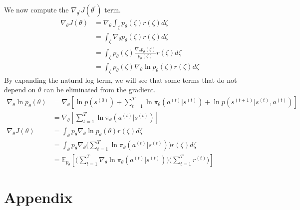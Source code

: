 \documentclass[11pt]{article}
\begin{document}
We now compute the $\nabla_{\theta^{'}}J(\theta^{'})$ term.
\begin{align*}
    \nabla_\theta J(\theta) &= \nabla_\theta \int_\zeta p_\theta(\zeta)r(\zeta)d\zeta \\ 
    &= \int_\zeta \nabla_\theta p_\theta(\zeta)r(\zeta)d\zeta \\
    &= \int_\zeta p_\theta(\zeta) \frac{\nabla_\theta p_\theta(\zeta)}{p_\theta(\zeta)}r(\zeta)d\zeta\\
    &= \int_\zeta p_\theta(\zeta) \nabla_\theta \ln p_\theta(\zeta)r(\zeta)d\zeta
\end{align*}
By expanding the natural log term, we will see that some terms that do not depend on $\theta$ can be eliminated from the gradient.
\begin{align*}
    \nabla_\theta \ln p_\theta(\theta) & = \nabla_\theta \left[ \ln p(s^{(0)}) + \sum_{t=1}^T \ln \pi_\theta(a^{(t)}|s^{(t)}) + \ln p(s^{(t+1)}|s^{(t)}, a^{(t)}) \right] \\
    & = \nabla_\theta \left[ \sum_{t=1}^T \ln \pi_\theta(a^{(t)}|s^{(t)})  \right] \\
    \nabla_\theta J(\theta) & = \int_\theta p_\theta \nabla_\theta \ln p_\theta(\theta)r(\zeta)d\zeta \\
    & = \int_\theta p_\theta \nabla_\theta \Bigg(\sum_{t=1}^T \ln \pi_\theta(a^{(t)}|s^{(t)})\Bigg) r(\zeta)d\zeta \\
    & = \mathbb{E}_{p_\theta}\left[ \Bigg( \sum_{t=1}^T \nabla_\theta \ln \pi_\theta(a^{(t)}|s^{(t)}) \Bigg) \Bigg( \sum_{t=1}^T r^{(t)} \Bigg) \right]
\end{align*}



{


}

\newpage
\section{Appendix}
\end{document}
